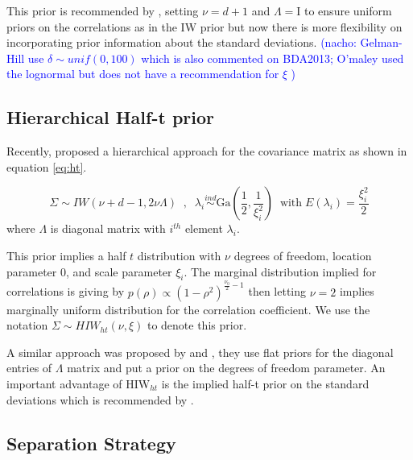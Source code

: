 \documentclass[12pt]{article}
\newcommand{\nacho}[1]{\textcolor{blue}{(nacho: #1)}}
\newcommand{\I}{\mathrm{I}}
\begin{document}
This prior is recommended by \cite{gelmanhill}, setting $\nu=d+1$ and $\Lambda=\I$ to ensure uniform priors on the correlations as in the IW prior but now there is more flexibility on incorporating prior information about the standard deviations. \nacho{ Gelman-Hill use $\delta \sim unif(0,100)$ which is also commented on BDA2013; O'maley used the lognormal but does not have a recommendation for $\xi$ }

\subsection{Hierarchical Half-t prior}

Recently, \cite{huang2013simple} proposed a hierarchical approach for the covariance matrix as shown in equation \eqref{eq:ht}. 

\begin{equation}
\Sigma \sim IW( \nu + d - 1 ,  2\nu\Lambda) \;\;,\;\;  \lambda_i  \stackrel{ind} \sim \mbox{Ga}\left(\frac{1}{2} , \frac{1}{\xi_i^2}\right) \;\; \mbox{with} \; E(\lambda_i)=\frac{\xi_i^2}{2} 
\label{eq:ht}
\end{equation} 
where $\Lambda$ is diagonal matrix with $i^{th}$ element $\lambda_i$. 

This prior implies a half $t$ distribution with $\nu$ degrees of freedom, location parameter 0, and scale parameter $\xi_i$.  The marginal distribution implied for correlations is giving by $p(\rho) \propto (1-\rho^2)^{\frac{\nu_0}{2}-1}$ then letting $\nu=2$ implies marginally uniform distribution for the correlation coefficient. We use the notation $\Sigma \sim HIW_{ht}(\nu, \xi)$ to denote this prior.

A similar approach was proposed by \cite{daniels1999} and \cite{matilde}, they use flat priors for the diagonal entries of $\Lambda$ matrix and put a prior on the degrees of freedom parameter.  An important advantage of  HIW$_{ht}$ is the implied half-t prior on the standard deviations which is recommended by \cite{gelman2006prior}.

\subsection{Separation Strategy \label{sec:ss} }
\end{document}
